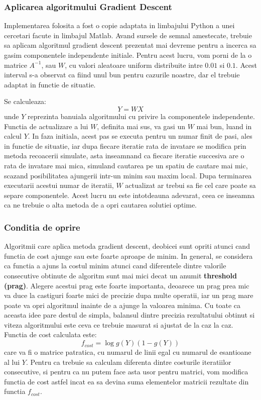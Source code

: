 \documentclass[12pt,oneside]{article}
\begin{document}
\subsubsection{Aplicarea algoritmului Gradient Descent}
Implementarea folosita a fost o copie adaptata in limbajului Python a unei cercetari facute in limbajul Matlab.\cite{vsubhashini} Avand sursele de semnal amestecate, trebuie sa aplicam algoritmul gradient descent prezentat mai devreme pentru a incerca sa gasim componentele independente initiale.  Pentru acest lucru, vom porni de la o matrice $A^{-1}$, sau $W$, cu valori aleatoare uniform distribuite intre $0.01$ si $0.1$. Acest interval s-a observat ca fiind unul bun pentru cazurile noastre, dar el trebuie adaptat in functie de situatie. 

Se calculeaza:
\begin{equation}
	Y=WX
\end{equation} 
unde $Y$ reprezinta banuiala algoritmului cu privire la componentele independente. Functia de actualizare a lui $W$, definita mai sus, va gasi un $W$ mai bun, luand in calcul $Y$. In faza initiala, acest pas se executa pentru un numar finit de pasi, ales in functie de situatie, iar dupa fiecare iteratie rata de invatare se modifica prin metoda recoacerii simulate, asta inseamnand ca fiecare iteratie succesiva are o rata de invatare mai mica, simuland cautarea pe un spatiu de cautare mai mic, scazand posibilitatea ajungerii intr-un minim sau maxim local. Dupa terminarea executarii acestui numar de iteratii, $W$ actualizat ar trebui sa fie cel care poate sa separe componentele. Acest lucru nu este intotdeauna adevarat, ceea ce inseamna ca ne trebuie o alta metoda de a opri cautarea solutiei optime.

\subsubsection{Conditia de oprire}
Algoritmii care aplica metoda gradient descent, deobicei sunt opriti atunci cand functia de cost ajunge sau este foarte aproape de minim. In general, se considera ca functia a ajuns la costul minim atunci cand diferentele dintre valorile consecutive obtinute de algoritm sunt mai mici decat un anumit \textbf{threshold (prag)}. Alegere acestui prag este foarte importanta, deoarece un prag prea mic va duce la castiguri foarte mici de precizie dupa multe operatii, iar un prag mare poate va opri algoritmul inainte de a ajunge la valoarea minima. Cu toate ca aceasta idee pare destul de simpla, balansul dintre precizia rezultatului obtinut si viteza algoritmului este ceva ce trebuie masurat si ajustat de la caz la caz. Functia de cost calculata este:
\begin{equation}
	f_{cost}=\log g(Y)(1-g(Y))
\end{equation}
care va fi o matrice patratica, cu numarul de linii egal cu numarul de esantioane al lui $Y$. Pentru ca trebuie sa calculam diferenta dintre costurile iteratiilor consecutive, si pentru ca nu putem face asta usor pentru matrici, vom modifica functia de cost astfel incat ea sa devina suma elementelor matricii rezultate din functia $f_{cost}$.
\end{document}
